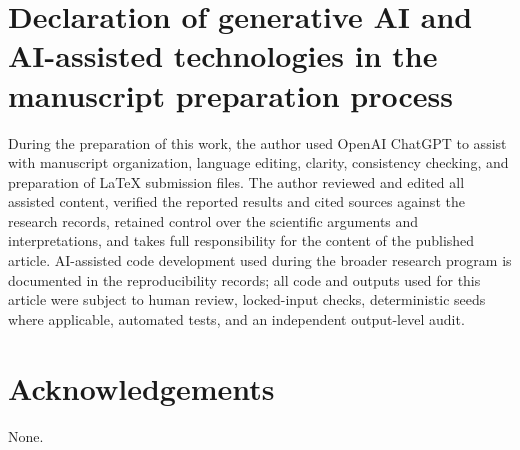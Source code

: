 \documentclass[a4paper,fleqn]{cas-sc}
\begin{document}
\section*{Declaration of generative AI and AI-assisted technologies in the manuscript preparation process}
During the preparation of this work, the author used OpenAI ChatGPT to assist with manuscript organization, language editing, clarity, consistency checking, and preparation of LaTeX submission files. The author reviewed and edited all assisted content, verified the reported results and cited sources against the research records, retained control over the scientific arguments and interpretations, and takes full responsibility for the content of the published article. AI-assisted code development used during the broader research program is documented in the reproducibility records; all code and outputs used for this article were subject to human review, locked-input checks, deterministic seeds where applicable, automated tests, and an independent output-level audit.

\section*{Acknowledgements}
None.



\end{document}
